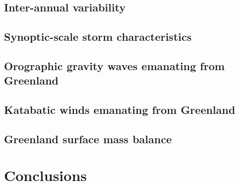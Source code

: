 \documentclass[draft]{agujournal2019}
\begin{document}
\subsection{Inter-annual variability}
\subsection{Synoptic-scale storm characteristics}
\subsection{Orographic gravity waves emanating from Greenland}
\subsection{Katabatic winds emanating from Greenland}
\subsection{Greenland surface mass balance}

%
%
%
%

\section{Conclusions}\label{sec:conclusions}
\end{document}
